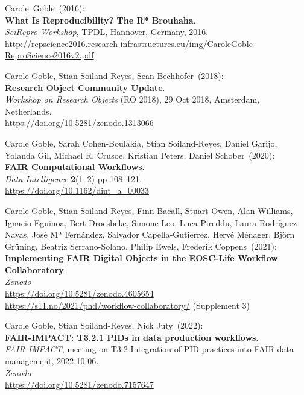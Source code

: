 \begin{thebibliography}{9}
Carole~Goble~(2016): \\
\textbf{What Is Reproducibility? The R* Brouhaha}.\\
\emph{SciRepro Workshop}, TPDL, Hannover, Germany, 2016.\\
\url{http://repscience2016.research-infrastructures.eu/img/CaroleGoble-ReproScience2016v2.pdf}

Carole Goble, Stian Soiland-Reyes, Sean Bechhofer~(2018): \\
\textbf{Research Object Community Update}.\\
\emph{Workshop on Research Objects} (RO 2018), 29 Oct 2018, Amsterdam, Netherlands.\\
\url{https://doi.org/10.5281/zenodo.1313066}

Carole Goble, Sarah Cohen-Boulakia, Stian Soiland-Reyes, Daniel Garijo, Yolanda Gil, Michael R. Crusoe, Kristian Peters, Daniel Schober~(2020): \\
\textbf{FAIR Computational Workflows}.\\
\emph{Data Intelligence} \textbf{2}(1--2) pp 108--121.\\
\url{https://doi.org/10.1162/dint_a_00033}

Carole Goble, Stian Soiland-Reyes, Finn Bacall, Stuart Owen, Alan Williams, Ignacio Eguinoa, Bert Droesbeke, Simone Leo, Luca Pireddu, Laura Rodríguez-Navas, José Mª Fernández, Salvador Capella-Gutierrez, Hervé Ménager, Björn Grüning, Beatriz Serrano-Solano, Philip Ewels, Frederik Coppens~(2021): \\
\textbf{Implementing FAIR Digital Objects in the EOSC-Life Workflow Collaboratory}.\\
\emph{Zenodo}\\
\url{https://doi.org/10.5281/zenodo.4605654}\\
\url{https://s11.no/2021/phd/workflow-collaboratory/} (Supplement 3)

Carole Goble, Stian Soiland-Reyes, Nick Juty~(2022): \\
\textbf{FAIR-IMPACT: T3.2.1 PIDs in data production workflows}.\\
\emph{FAIR-IMPACT}, meeting on T3.2 Integration of PID practices into FAIR data management, 2022-10-06.\\
\emph{Zenodo}\\
\url{https://doi.org/10.5281/zenodo.7157647}


\end{thebibliography}
